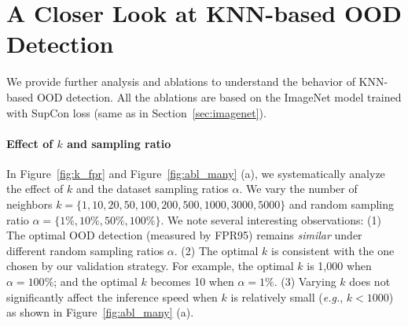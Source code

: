 \documentclass[nohyperref]{article}
\theoremstyle{plain}
\theoremstyle{definition}
\theoremstyle{remark}
\begin{document}
\begin{table*}[h]
\centering
\caption{Performance comparison (FPR95) on ViT-B/16 model fine-tuned on ImageNet-1k.}
\label{tab:vit}
\end{table*}


\section{A Closer Look at KNN-based OOD Detection}
We provide further analysis and ablations to understand the behavior of KNN-based OOD detection. All the ablations are based on the ImageNet model trained with SupCon loss (same as in Section~\ref{sec:imagenet}).

\label{sec:discussion}

\paragraph{Effect of $k$ and sampling ratio}
In Figure~\ref{fig:k_fpr} and Figure~\ref{fig:abl_many} (a), we systematically analyze the effect of $k$ and the dataset sampling ratios $\alpha$. We vary the number of neighbors $k=\{1,10,20,50,100,200,500,1000,3000,5000\}$ and random sampling ratio $\alpha = \{1\%,10\%,50\%,100\%\}$. We note several interesting observations: (1) The optimal OOD detection (measured by FPR95) remains \emph{similar} under different random sampling ratios $\alpha$. (2) The optimal $k$ is consistent with the one chosen by our validation strategy. For example, the optimal $k$ is 1,000 when $\alpha=100\%$; and the optimal $k$ becomes 10 when $\alpha=1\%$. (3) Varying $k$ does not significantly affect the inference speed when $k$ is relatively small (\emph{e.g.}, $k<1000$) as shown in Figure~\ref{fig:abl_many} (a). 
\end{document}
